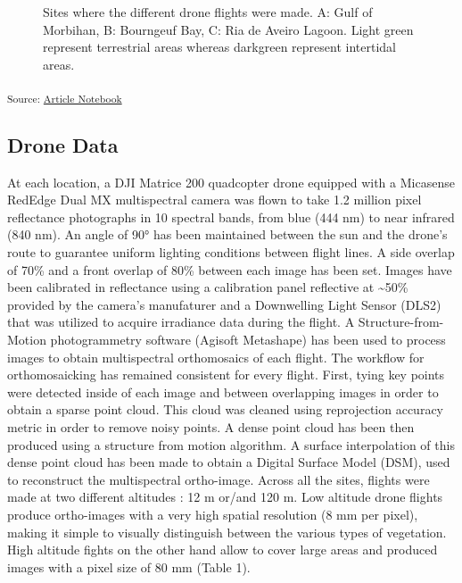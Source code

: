 \documentclass[
  number]{elsarticle}
\begin{document}
\label{cell-fig-map}
\begin{figure}[H]


\caption{\label{fig-map}Sites where the different drone flights were
made. A: Gulf of Morbihan, B: Bourngeuf Bay, C: Ria de Aveiro Lagoon.
Light green represent terrestrial areas whereas darkgreen represent
intertidal areas.}

\end{figure}%

\textsubscript{Source:
\href{https://SigOiry.github.io/Drone_Paper_2023/index.qmd.html}{Article
Notebook}}

\subsection{Drone Data}\label{drone-data}

At each location, a DJI Matrice 200 quadcopter drone equipped with a
Micasense RedEdge Dual MX multispectral camera was flown to take 1.2
million pixel reflectance photographs in 10 spectral bands, from blue
(444 nm) to near infrared (840 nm). An angle of 90° has been maintained
between the sun and the drone's route to guarantee uniform lighting
conditions between flight lines. A side overlap of 70\% and a front
overlap of 80\% between each image has been set. Images have been
calibrated in reflectance using a calibration panel reflective at
\textasciitilde50\% provided by the camera's manufaturer and a
Downwelling Light Sensor (DLS2) that was utilized to acquire irradiance
data during the flight. A Structure-from-Motion photogrammetry software
(Agisoft Metashape) has been used to process images to obtain
multispectral orthomosaics of each flight. The workflow for
orthomosaicking has remained consistent for every flight. First, tying
key points were detected inside of each image and between overlapping
images in order to obtain a sparse point cloud. This cloud was cleaned
using reprojection accuracy metric in order to remove noisy points. A
dense point cloud has been then produced using a structure from motion
algorithm. A surface interpolation of this dense point cloud has been
made to obtain a Digital Surface Model (DSM), used to reconstruct the
multispectral ortho-image. Across all the sites, flights were made at
two different altitudes : 12 m or/and 120 m. Low altitude drone flights
produce ortho-images with a very high spatial resolution (8 mm per
pixel), making it simple to visually distinguish between the various
types of vegetation. High altitude fights on the other hand allow to
cover large areas and produced images with a pixel size of 80 mm (Table
1).
\end{document}
